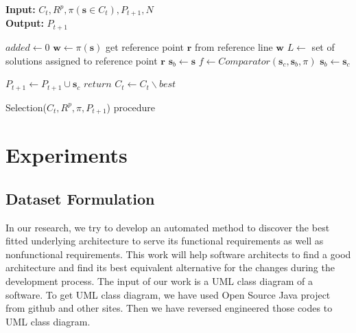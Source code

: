 \documentclass[letterpaper, 10 pt, conference]{ieeeconf}  %
\begin{document}
\begin{algorithm}[!ht]
	
 	\textbf{Input:} $C_t,R^p,\pi(\mathbf{s} \in C_t),P_{t+1},N$\\
 	\textbf{Output:} $P_{t+1}$
	
 	\begin{algorithmic}[1]
    \State $added \gets 0$
    \State $\mathbf{w} \gets \pi(\mathbf{s})$
    \State get reference point $\textbf{r}$ from reference line $\mathbf{w}$
    \State $L \gets $ set of solutions assigned to reference point $\textbf{r}$
    \State $\mathbf{s}_b \gets \mathbf{s}$
    \State $ f \gets Comparator(\mathbf{s}_c,\mathbf{s}_b,\pi)$
    \State $\mathbf{s}_b \gets \mathbf{s}_c$
    \EndIf
    
    \EndFor
    \State $P_{t+1} \gets P_{t+1} \cup \mathbf{s}_c$
    \State $return$
    \EndIf
    \State $C_{t} \gets C_{t}\backslash best $
    
    
    
    \EndFor
	\end{algorithmic}
    \caption{Selection($C_t,R^p,\pi,P_{t+1}$) procedure}
 	\label{alg:selection}
 \end{algorithm}
 


\section{Experiments}
\subsection{Dataset Formulation}
In our research, we try to develop an automated method to discover the best fitted underlying architecture to serve its functional requirements as well as nonfunctional requirements. This work will help software architects to find a good architecture and find its best equivalent alternative for the changes during the development process. The input of our work is a UML class diagram of a software. To get UML class diagram, we have used Open Source Java project from github and other sites. Then we have reversed engineered those codes to UML class diagram. 
\end{document}
